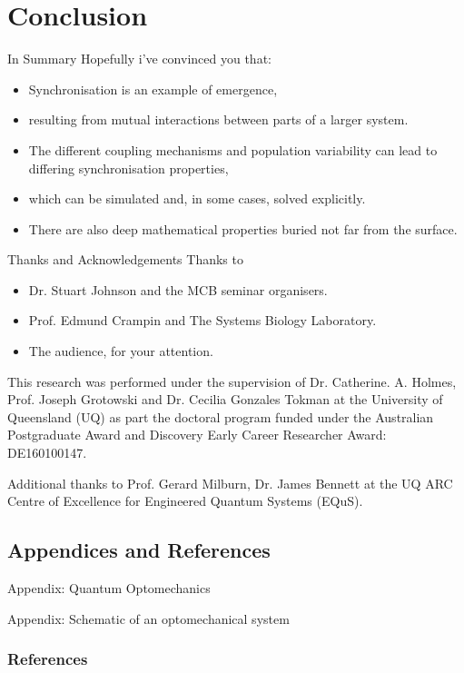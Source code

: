 \documentclass[10pt,reqno]{beamer}
\begin{document}
\section{Conclusion}
\begin{frame}{In Summary}
Hopefully i've convinced you that:
\begin{itemize}
	\item Synchronisation is an example of emergence,
	\item resulting from mutual interactions between parts of a larger system.
	\item The different coupling mechanisms and population variability can lead to differing synchronisation properties,
	\item which can be simulated and, in some cases, solved explicitly.
	\item There are also deep mathematical properties buried not far from the surface.
\end{itemize}
\end{frame}
\begin{frame}{Thanks and Acknowledgements}
Thanks to 
\begin{itemize}
	\item Dr. Stuart Johnson and the MCB seminar organisers.
	\item Prof. Edmund Crampin and The Systems Biology Laboratory.
	\item The audience, for your attention.
\end{itemize}

\vfill

This research was performed under the supervision of Dr. Catherine. A. Holmes, Prof. Joseph Grotowski and Dr. Cecilia Gonzales Tokman at the University of Queensland (UQ) as part the doctoral program funded under the Australian Postgraduate Award and Discovery Early Career Researcher Award: DE160100147.
\vspace{12pt}

Additional thanks to Prof. Gerard Milburn, Dr. James Bennett at the UQ ARC Centre of Excellence for Engineered Quantum Systems (EQuS).
\end{frame}
\subsection{Appendices and References}
\begin{frame}{Appendix: Quantum Optomechanics}
\begin{figure}
\end{figure}
\end{frame}
\begin{frame}{Appendix: Schematic of an optomechanical system}
\begin{figure}
\end{figure}
\end{frame}
\begin{frame}[allowframebreaks]
\frametitle{References}
\tiny
\printbibliography
\end{frame}
\end{document}
